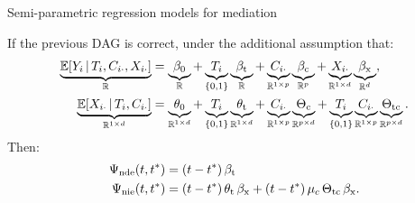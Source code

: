 \documentclass[aspectratio=169]{beamer}
\theoremstyle{remark}
\begin{document}
\begin{frame}{Semi-parametric regression models for mediation}

    If the previous DAG is correct, under the additional assumption that:
    \begin{equation*}
        \begin{aligned}
            \underbrace{\E[T_i, \C_{i \cdot}, \X_{i \cdot}]{Y_i}}_{\R}
             & = \underbrace{\betazero}_{\R}
            + \underbrace{T_i}_{\{0, 1\}} \underbrace{\betat}_{\R}
            + \underbrace{\C_{i \cdot}}_{\R^{1 \times p}} \underbrace{\betac}_{\R^{p}}
            + \underbrace{\X_{i \cdot}}_{\R^{1 \times d}} \underbrace{\betax}_{\R^d}, \\
            \underbrace{\E[T_i, \C_{i \cdot}]{\X_{i \cdot}}}_{\R^{1 \times d}}
             & = \underbrace{\thetazero}_{\R^{1 \times d}}
            + \underbrace{T_i}_{\{0, 1\}} \underbrace{\thetat}_{\R^{1 \times d}}
            + \underbrace{\C_{i \cdot}}_{\R^{1 \times p}} \underbrace{\Thetac}_{\R^{p \times d}}
            + \underbrace{T_i}_{\{0, 1\}} \underbrace{\C_{i \cdot}}_{\R^{1 \times p}} \underbrace{\Thetatc}_{\R^{p \times d}}.
        \end{aligned}
    \end{equation*}
    Then:
    \begin{align*}
        \ndef & = \paren*{t - t^*} \, \betat                                                        \\
        \nief & = \paren*{t - t^*} \, \thetat \, \betax + (t - t^*) \, \mu_c \, \Thetatc \, \betax.
    \end{align*}

\end{frame}
\end{document}
